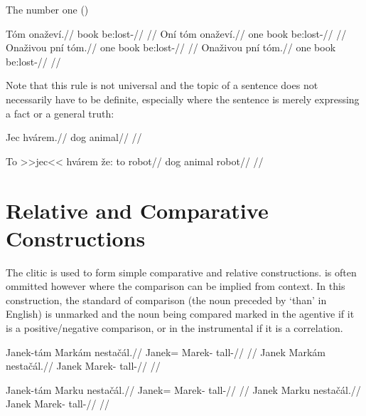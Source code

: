 The number one ()

\pex
\a
\begingl
\gla T\'om ona\v{z}ev\'i.//
\glb book be:lost-//
\glft {}//
\endgl
\a
\begingl
\gla On\'i t\'om ona\v{z}ev\'i.//
\glb one book be:lost-//
\glft {}//
\endgl
\a
\begingl
\gla Ona\v{z}ivou pn\'i t\'om.//
\glb one book be:lost-//
\glft {}//
\endgl
\a
\begingl
\gla Ona\v{z}ivou pn\'i t\'om.//
\glb one book be:lost-//
\glft {}//
\endgl
\xe


Note that this rule is not universal and the topic of a sentence does not necessarily have to be definite, especially where the sentence is merely expressing a fact or a general truth:

\pex
\begingl
\gla Jec hv\'arem.//
\glb dog animal//
\glft {}//
\endgl
\xe



\pex
\begingl
\gla To >>jec<< hv\'arem \v{z}e: to robot//
\glb {} dog animal   robot//
\glft {}//
\endgl
\xe


\section{Relative and Comparative Constructions}\label{relativecomparative}

The clitic  is used to form simple comparative and relative constructions.  is often ommitted however where the comparison can be implied from context. In this construction, the standard of comparison (the noun preceded by `than' in English) is unmarked and the noun being compared marked in the agentive if it is a positive/negative comparison, or in the instrumental if it is a correlation.


\pex
\a
\begingl
\gla Janek-t\'am Mark\'am nesta\v{c}\'al.//
\glb Janek= Marek- tall-//
\glft {}//
\endgl
\a
\begingl
\gla Janek Mark\'am nesta\v{c}\'al.//
\glb Janek Marek- tall-//
\glft {}//
\endgl
\xe

\pex
\a
\begingl
\gla Janek-t\'am Marku nesta\v{c}\'al.//
\glb Janek= Marek- tall-//
\glft {}//
\endgl
\a
\begingl
\gla Janek Marku nesta\v{c}\'al.//
\glb Janek Marek- tall-//
\glft {}//
\endgl
\xe

